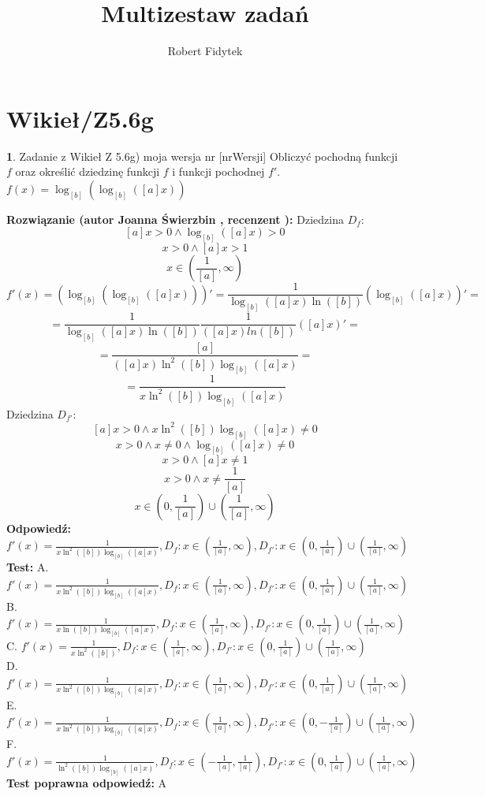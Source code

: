 \documentclass[12pt, a4paper]{article}
\title{Multizestaw zadań}
\author{Robert Fidytek}
\date{}
\theoremstyle{definition} %
\newtheorem{zad}{}
\newcommand{\kategoria}[1]{\section{#1}} %
\newcommand{\zadStart}[1]{\begin{zad}#1\newline} %
\newcommand{\zadStop}{\end{zad}}   %
\newcommand{\rozwStart}[2]{\noindent \textbf{Rozwiązanie (autor #1 , recenzent #2): }\newline} %
\newcommand{\rozwStop}{\newline}                                            %
\newcommand{\odpStart}{\noindent \textbf{Odpowiedź:}\newline}    %
\newcommand{\odpStop}{\newline}                                             %
\newcommand{\testStart}{\noindent \textbf{Test:}\newline} %
\newcommand{\testStop}{\newline} %
\newcommand{\kluczStart}{\noindent \textbf{Test poprawna odpowiedź:}\newline} %
\newcommand{\kluczStop}{\newline} %
\begin{document}
\maketitle


\kategoria{Wikieł/Z5.6g}
\zadStart{Zadanie z Wikieł Z 5.6g) moja wersja nr [nrWersji]}
Obliczyć pochodną funkcji $f$ oraz określić dziedzinę funkcji $f$ i funkcji pochodnej $f'$.\\
$f(x)=\log_{[b]}{(\log_{[b]}([a]x))}$
\zadStop
\rozwStart{Joanna Świerzbin}{}
Dziedzina $D_f: $
$$[a]x>0 \land \log_{[b]}([a]x)>0 $$
$$x>0 \land [a]x>1$$
$$x\in \left(\frac{1}{[a]},\infty \right) $$
$$ f'(x)=\left(\log_{[b]}{(\log_{[b]}([a]x))}\right)'=\frac{1}{\log_{[b]}([a]x)\ln([b])}\left( \log_{[b]} ([a]x) \right)'= $$
$$ = \frac{1}{\log_{[b]}([a]x)\ln([b])}\frac{1}{([a]x)ln([b])}\left([a]x\right)' =$$ 
$$ = \frac{[a]}{([a]x)\ln^2([b])\log_{[b]}([a]x)} =$$ 
$$ = \frac{1}{x\ln^2([b])\log_{[b]}([a]x)}$$ 
Dziedzina $D_{f'}:$
$$ [a]x> 0 \land {x\ln^2([b])\log_{[b]}([a]x)} \neq 0 $$
$$ x> 0 \land x \neq 0 \land \log_{[b]}([a]x) \neq 0 $$
$$ x> 0 \land [a]x \neq 1 $$
$$ x> 0 \land x \neq \frac{1}{[a]} $$
$$x \in \left(0,\frac{1}{[a]}\right) \cup \left( \frac{1}{[a]}, \infty \right) $$
\rozwStop
\odpStart
$f'(x)= \frac{1}{x\ln^2([b])\log_{[b]}([a]x)} , D_f: x\in \left(\frac{1}{[a]},\infty \right), D_{f'}: x \in \left(0,\frac{1}{[a]}\right) \cup \left( \frac{1}{[a]}, \infty \right)$
\odpStop
\testStart
A. $f'(x)= \frac{1}{x\ln^2([b])\log_{[b]}([a]x)} , D_f: x\in \left(\frac{1}{[a]},\infty \right), D_{f'}: x \in \left(0,\frac{1}{[a]}\right) \cup \left( \frac{1}{[a]}, \infty \right)$\\
B. $f'(x)= \frac{1}{x\ln([b])\log_{[b]}([a]x)} , D_f: x\in \left(\frac{1}{[a]},\infty \right), D_{f'}: x \in \left(0,\frac{1}{[a]}\right) \cup \left( \frac{1}{[a]}, \infty \right)$\\
C. $f'(x)= \frac{1}{x\ln^2([b])} , D_f: x\in \left(\frac{1}{[a]},\infty \right), D_{f'}: x \in \left(0,\frac{1}{[a]}\right) \cup \left( \frac{1}{[a]}, \infty \right)$\\
D. $f'(x)= \frac{1}{x\ln^2([b])\log_{[b]}([a]x)} , D_f: x\in \left(\frac{1}{[a]},\infty \right), D_{f'}: x \in \left(0,\frac{1}{[a]}\right) \cup \left( \frac{1}{[a]}, \infty \right)$\\
E. $f'(x)= \frac{1}{x\ln^2([b])\log_{[b]}([a]x)} , D_f: x\in \left(\frac{1}{[a]},\infty \right), D_{f'}: x \in \left(0,-\frac{1}{[a]}\right) \cup \left( \frac{1}{[a]}, \infty \right)$\\
F. $f'(x)= \frac{1}{\ln^2([b])\log_{[b]}([a]x)} , D_f: x\in \left(-\frac{1}{[a]}, \frac{1}{[a]} \right), D_{f'}: x \in \left(0,\frac{1}{[a]}\right) \cup \left( \frac{1}{[a]}, \infty \right)$
\testStop
\kluczStart
A
\kluczStop
\end{document}
